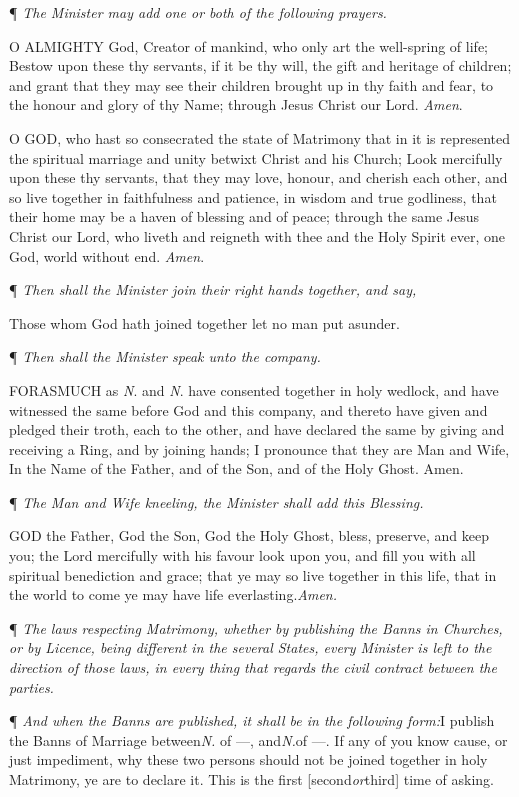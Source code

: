 ¶
\emph{The Minister may add one or both of the following prayers.}

O
ALMIGHTY God, Creator of mankind, who only art the well-spring of life;
Bestow upon these thy servants, if it be thy will, the gift and heritage
of children; and grant that they may see their children brought up in
thy faith and fear, to the honour and glory of thy Name; through Jesus
Christ our Lord. \emph{Amen}.

O
GOD, who hast so consecrated the state of Matrimony that in it is represented
the spiritual marriage and unity betwixt Christ and his Church; Look mercifully
upon these thy servants, that they may love, honour, and cherish each
other, and so live together in faithfulness and patience, in wisdom and
true godliness, that their home may be a haven of blessing and of peace;
through the same Jesus Christ our Lord, who liveth and reigneth with thee
and the Holy Spirit ever, one God, world without end. \emph{Amen}.

¶
\emph{Then shall the Minister join their right hands together, and say,}

Those whom God hath joined together let no man put asunder.

¶
\emph{Then shall the Minister speak unto the company.}

FORASMUCH
as \emph{N}. and \emph{N}. have consented together in holy wedlock,
and have witnessed the same before God and this company, and thereto have
given and pledged their troth, each to the other, and have declared the
same by giving and receiving a Ring, and by joining hands; I pronounce
that they are Man and Wife, In the Name of the Father, and of the Son,
and of the Holy Ghost. Amen.

¶
\emph{The Man and Wife kneeling, the Minister shall add this Blessing.}

GOD
the Father, God the Son, God the Holy Ghost, bless, preserve, and keep
you; the Lord mercifully with his favour look upon you, and fill you with
all spiritual benediction and grace; that ye may so live together in this
life, that in the world to come ye may have life everlasting.\emph{Amen.}

¶
\emph{The laws respecting Matrimony, whether by publishing the Banns in
Churches, or by Licence, being different in the several States, every
Minister is left to the direction of those laws, in every thing that regards
the civil contract between the parties.}

¶ \emph{And when the Banns are published, it shall be in the following
form:}I publish the Banns of Marriage between\emph{N.} of —,
and\emph{N.}of —. If any of you know cause, or just impediment,
why these two persons should not be joined together in holy Matrimony,
ye are to declare it. This is the first [second\emph{or}third] time
of asking.

